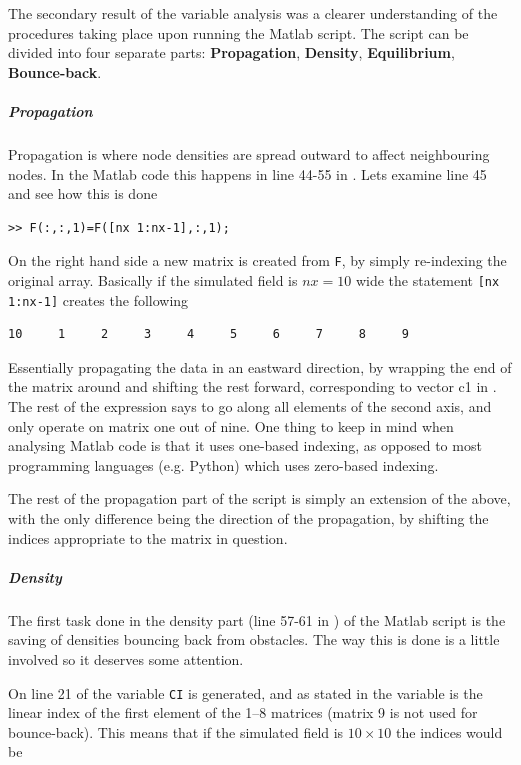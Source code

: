 The secondary result of the variable analysis was a clearer understanding of the procedures taking place upon running the Matlab script. The script can be divided into four separate parts: \textbf{Propagation}, \textbf{Density}, \textbf{Equilibrium}, \textbf{Bounce-back}.

\subparagraph{Propagation} 
Propagation is where node densities are spread outward to affect neighbouring nodes. In the Matlab code this happens in line 44-55 in . Lets examine line 45 and see how this is done

\begin{verbatim}
>> F(:,:,1)=F([nx 1:nx-1],:,1);
\end{verbatim}

On the right hand side a new matrix is created from \texttt{F}, by simply re-indexing the original array. Basically if the simulated field is $nx=10$ wide the statement \texttt{[nx 1:nx-1]} creates the following

\begin{verbatim}
10     1     2     3     4     5     6     7     8     9
\end{verbatim}

Essentially propagating the data in an eastward direction, by wrapping the end of the matrix around and shifting the rest forward, corresponding to vector c1 in . The rest of the expression says to go along all elements of the second axis, and only operate on matrix one out of nine. One thing to keep in mind when analysing Matlab code is that it uses one-based indexing, as opposed to most programming languages (e.g. Python) which uses zero-based indexing.

The rest of the propagation part of the script is simply an extension of the above, with the only difference being the direction of the propagation, by shifting the indices appropriate to the matrix in question.

\subparagraph*{Density}
The first task done in the density part (line 57-61 in ) of the Matlab script is the saving of densities bouncing back from obstacles. The way this is done is a little involved so it deserves some attention.

On line 21 of  the variable \texttt{CI} is generated, and as stated in  the variable is the linear index of the first element of the 1--8 matrices (matrix 9 is not used for bounce-back). This means that if the simulated field is $10\times10$ the indices would be

